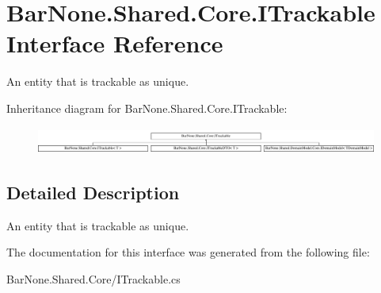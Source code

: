 \hypertarget{interface_bar_none_1_1_shared_1_1_core_1_1_i_trackable}{}\section{Bar\+None.\+Shared.\+Core.\+I\+Trackable Interface Reference}
\label{interface_bar_none_1_1_shared_1_1_core_1_1_i_trackable}


An entity that is trackable as unique.  


Inheritance diagram for Bar\+None.\+Shared.\+Core.\+I\+Trackable\+:\begin{figure}[H]
\begin{center}
\leavevmode
\includegraphics[height=0.888889cm]{interface_bar_none_1_1_shared_1_1_core_1_1_i_trackable}
\end{center}
\end{figure}


\subsection{Detailed Description}
An entity that is trackable as unique. 



The documentation for this interface was generated from the following file\+:\begin{DoxyCompactItemize}
\item 
Bar\+None.\+Shared.\+Core/I\+Trackable.\+cs\end{DoxyCompactItemize}
